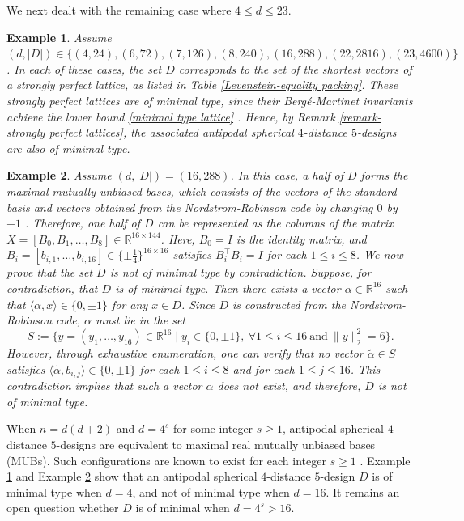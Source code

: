 \documentclass[11pt]{article}
\newtheorem{example}{Example}[section]
\theoremstyle{definition}
\theoremstyle{remark}
\begin{document}
We next dealt with the remaining case where $4\leq d\leq 23$. 

\begin{example}\label{antipodal-example}
Assume $(d,|D|)\in \{(4,24), (6,72),(7,126),(8,240),(16,288),(22,2816),(23,4600)\}$. 
In each of these cases, the set $D$ corresponds to  the set of the shortest vectors of a strongly perfect lattice, as listed in Table \ref{Levenstein-equality packing}.
These strongly perfect lattices are of minimal type,  since their Berg\'e-Martinet invariants achieve the lower bound \eqref{minimal type lattice} \cite{Mar13,HN20,CS88}.
Hence, by Remark \ref{remark-strongly perfect lattices},  the associated antipodal spherical $4$-distance $5$-designs are also of minimal type.
\end{example}

\begin{example}
\label{example-16-144}
Assume $(d,|D|)=(16,288)$.
In this case, a half of $D$ forms the maximal mutually unbiased bases, which consists of the vectors of the standard basis and vectors obtained from the Nordstrom-Robinson code by changing $0$ by $-1$ \cite{CCKS97}. 
Therefore, one half of $D$ can be represented as the columns of the matrix $X=[B_0, B_1,\ldots, B_8]\in\mathbb{R}^{16\times 144}$.
Here, $B_0=I$ is the identity matrix, and $B_i=[b_{i,1},\ldots,b_{i,16}]\in \{\pm \frac{1}{4}\}^{16\times 16}$ satisfies $B_i^\top B_i=I$ for each $1\leq i\leq 8$.
We now prove that the set $D$ is not of minimal type by contradiction. 
Suppose, for contradiction, that $D$ is of minimal type. 
Then there exists a vector $\alpha\in\mathbb{R}^{16}$ such that $\langle \alpha, x\rangle\in\{0,\pm 1\}$ for any $x\in D$.
Since $D$ is constructed from the Nordstrom-Robinson code, $\alpha$ must lie in the set
\begin{equation*}
S:=\{ y=(y_1,\ldots,y_{16})\in\mathbb{R}^{16}\mid  y_i\in\{0,\pm 1\},\ \forall 1\leq i\leq 16\  \text{and}\  \|y\|_2^2=6 \}.
\end{equation*}
However, through exhaustive enumeration, one can verify that no vector $\widetilde{\alpha}\in S$ satisfies $\langle \widetilde{\alpha}, b_{i,j} \rangle\in\{0,\pm 1\}$ for each $1\leq i\leq 8$ and for each $1\leq j\leq 16$.
This contradiction implies that such a vector $\alpha$ does not exist, and therefore, $D$ is not of minimal type.


\end{example}

When $n=d(d+2)$ and $d=4^s$ for some integer $s\geq 1$, antipodal spherical $4$-distance $5$-designs are equivalent to maximal real mutually unbiased bases (MUBs). 
Such configurations are known to exist for each integer $s\geq 1$ \cite{CCKS97}. 
Example \ref{antipodal-example} and Example \ref{example-16-144} show that an antipodal spherical $4$-distance $5$-design $D$ is of minimal type when $d=4$, and not of minimal type when $d=16$.
It remains an open question whether $D$ is of minimal when $d=4^s>16$.
\end{document}
